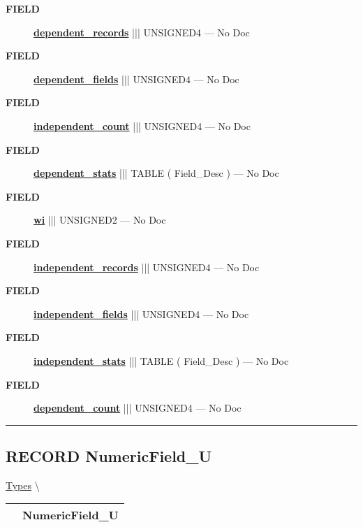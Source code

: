 \par
\begin{description}
\item [\colorbox{tagtype}{\color{white} \textbf{\textsf{FIELD}}}] \textbf{\underline{dependent\_records}} ||| UNSIGNED4 --- No Doc
\item [\colorbox{tagtype}{\color{white} \textbf{\textsf{FIELD}}}] \textbf{\underline{dependent\_fields}} ||| UNSIGNED4 --- No Doc
\item [\colorbox{tagtype}{\color{white} \textbf{\textsf{FIELD}}}] \textbf{\underline{independent\_count}} ||| UNSIGNED4 --- No Doc
\item [\colorbox{tagtype}{\color{white} \textbf{\textsf{FIELD}}}] \textbf{\underline{dependent\_stats}} ||| TABLE ( Field\_Desc ) --- No Doc
\item [\colorbox{tagtype}{\color{white} \textbf{\textsf{FIELD}}}] \textbf{\underline{wi}} ||| UNSIGNED2 --- No Doc
\item [\colorbox{tagtype}{\color{white} \textbf{\textsf{FIELD}}}] \textbf{\underline{independent\_records}} ||| UNSIGNED4 --- No Doc
\item [\colorbox{tagtype}{\color{white} \textbf{\textsf{FIELD}}}] \textbf{\underline{independent\_fields}} ||| UNSIGNED4 --- No Doc
\item [\colorbox{tagtype}{\color{white} \textbf{\textsf{FIELD}}}] \textbf{\underline{independent\_stats}} ||| TABLE ( Field\_Desc ) --- No Doc
\item [\colorbox{tagtype}{\color{white} \textbf{\textsf{FIELD}}}] \textbf{\underline{dependent\_count}} ||| UNSIGNED4 --- No Doc
\end{description}





\rule{\linewidth}{0.5pt}
\subsection*{\textsf{\colorbox{headtoc}{\color{white} RECORD}
NumericField\_U}}

\hypertarget{ecldoc:logisticregression.types.numericfield_u}{}
\hspace{0pt} \hyperlink{ecldoc:LogisticRegression.Types}{Types} \textbackslash 

{\renewcommand{\arraystretch}{1.5}
\begin{tabularx}{\textwidth}{|>{\raggedright\arraybackslash}l|X|}
\hline
\hspace{0pt}\mytexttt{\color{red} } & \textbf{NumericField\_U} \\
\hline
\end{tabularx}
}

